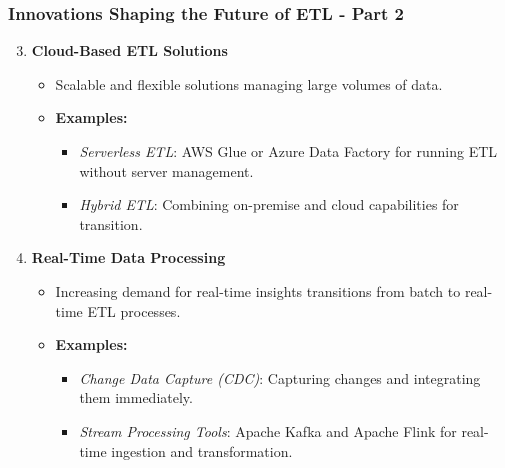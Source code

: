 \documentclass[aspectratio=169]{beamer}
\begin{document}
\begin{frame}[fragile]
    \frametitle{Innovations Shaping the Future of ETL - Part 2}
    \begin{enumerate}
        \setcounter{enumi}{2} %
        \item \textbf{Cloud-Based ETL Solutions}
        \begin{itemize}
            \item Scalable and flexible solutions managing large volumes of data.
            \item \textbf{Examples:}
            \begin{itemize}
                \item \textit{Serverless ETL}: AWS Glue or Azure Data Factory for running ETL without server management.
                \item \textit{Hybrid ETL}: Combining on-premise and cloud capabilities for transition.
            \end{itemize}
        \end{itemize}        
        \item \textbf{Real-Time Data Processing}
        \begin{itemize}
            \item Increasing demand for real-time insights transitions from batch to real-time ETL processes.
            \item \textbf{Examples:}
            \begin{itemize}
                \item \textit{Change Data Capture (CDC)}: Capturing changes and integrating them immediately.
                \item \textit{Stream Processing Tools}: Apache Kafka and Apache Flink for real-time ingestion and transformation.
            \end{itemize}
        \end{itemize}        
    \end{enumerate}
\end{frame}
\end{document}
